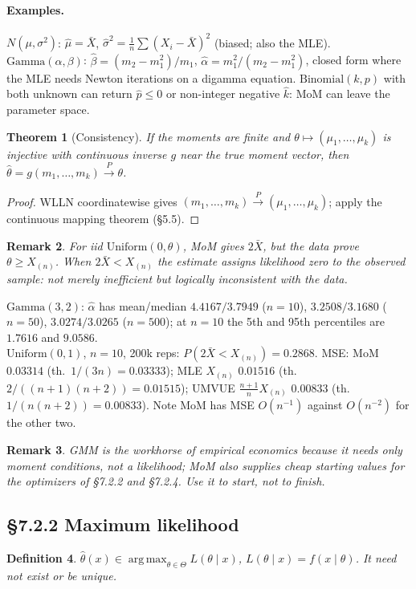\documentclass[11pt]{article}
\newtheorem{theorem}{Theorem}[section]
\newtheorem{definition}[theorem]{Definition}
\newtheorem{remark}[theorem]{Remark}
\DeclareMathOperator*{\argmax}{arg\,max}
\newcommand{\convP}{\xrightarrow{P}}
\begin{document}
\paragraph{Examples.} $N(\mu,\sigma^2)$: $\hat\mu=\bar X$, $\hat\sigma^2=\frac1n\sum(X_i-\bar X)^2$ (biased; also the MLE). $\mathrm{Gamma}(\alpha,\beta)$: $\hat\beta=(m_2-m_1^2)/m_1$, $\hat\alpha=m_1^2/(m_2-m_1^2)$, closed form where the MLE needs Newton iterations on a digamma equation. $\mathrm{Binomial}(k,p)$ with both unknown can return $\hat p\le0$ or non-integer negative $\hat k$: MoM can leave the parameter space.
\begin{theorem}[Consistency]
If the moments are finite and $\theta\mapsto(\mu_1,\dots,\mu_k)$ is injective with continuous inverse $g$ near the true moment vector, then $\hat\theta=g(m_1,\dots,m_k)\convP\theta$.
\end{theorem}
\begin{proof}
WLLN coordinatewise gives $(m_1,\dots,m_k)\convP(\mu_1,\dots,\mu_k)$; apply the continuous mapping theorem (\S5.5).
\end{proof}
\begin{remark}
For iid $\mathrm{Uniform}(0,\theta)$, MoM gives $2\bar X$, but the data prove $\theta\ge X_{(n)}$. When $2\bar X<X_{(n)}$ the estimate assigns likelihood zero to the observed sample: not merely inefficient but logically inconsistent with the data.
\end{remark}
\begin{simbox}
$\mathrm{Gamma}(3,2)$: $\hat\alpha$ has mean/median $4.4167/3.7949$ ($n=10$), $3.2508/3.1680$ ($n=50$), $3.0274/3.0265$ ($n=500$); at $n=10$ the 5th and 95th percentiles are $1.7616$ and $9.0586$.\\
$\mathrm{Uniform}(0,1)$, $n=10$, 200k reps: $P(2\bar X<X_{(n)})=0.2868$. MSE: MoM $0.03314$ (th.\ $1/(3n)=0.03333$); MLE $X_{(n)}$ $0.01516$ (th.\ $2/((n+1)(n+2))=0.01515$); UMVUE $\frac{n+1}{n}X_{(n)}$ $0.00833$ (th.\ $1/(n(n+2))=0.00833$). Note MoM has MSE $O(n^{-1})$ against $O(n^{-2})$ for the other two.
\end{simbox}
\begin{remark}
GMM is the workhorse of empirical economics because it needs only moment conditions, not a likelihood; MoM also supplies cheap starting values for the optimizers of \S7.2.2 and \S7.2.4. Use it to start, not to finish.
\end{remark}

\subsection{\S7.2.2 Maximum likelihood}
\begin{definition}
$\hat\theta(x)\in\argmax_{\theta\in\Theta}L(\theta\mid x)$, $L(\theta\mid x)=f(x\mid\theta)$. It need not exist or be unique.
\end{definition}
\end{document}

